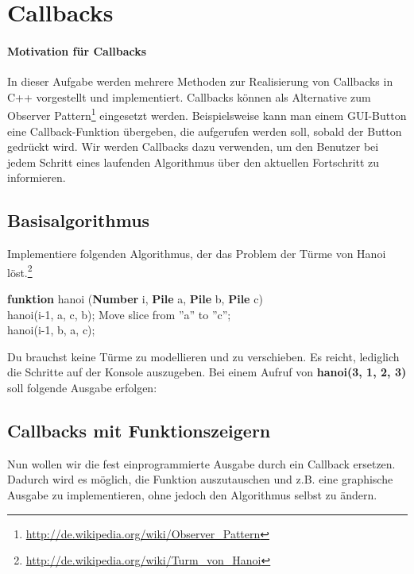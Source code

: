 \section{\ExercisePrefixAdvanced Callbacks}
\label{sec:callbacks}

\paragraph*{Motivation für Callbacks}
In dieser Aufgabe werden mehrere Methoden zur Realisierung von Callbacks in C++ vorgestellt und implementiert.
Callbacks können als Alternative zum Observer Pattern\footnote{\url{http://de.wikipedia.org/wiki/Observer_Pattern}} eingesetzt werden.
Beispielsweise kann man einem GUI-Button eine Callback-Funktion übergeben, die aufgerufen werden soll, sobald der Button gedrückt wird.
Wir werden Callbacks dazu verwenden, um den Benutzer bei jedem Schritt eines laufenden Algorithmus über den aktuellen Fortschritt zu informieren.

\subsection{Basisalgorithmus}
Implementiere folgenden Algorithmus, der das Problem der Türme von Hanoi löst.\footnote{\url{http://de.wikipedia.org/wiki/Turm_von_Hanoi}}\\
\begin{algorithm}[H]
 \SetAlgoLined
 \textbf{funktion} hanoi (\textbf{Number} i, \textbf{Pile} a, \textbf{Pile} b, \textbf{Pile} c) { \\
      {
        hanoi(i-1, a, c, b); 
        Move slice from ''a'' to ''c''; \\
        hanoi(i-1, b, a, c); 
     }
 }
\end{algorithm}

Du brauchst keine Türme zu modellieren und zu verschieben.
Es reicht, lediglich die Schritte auf der Konsole auszugeben. 
Bei einem Aufruf von \textbf{hanoi(3, 1, 2, 3)} soll folgende Ausgabe erfolgen:


\subsection{Callbacks mit Funktionszeigern}
Nun wollen wir die fest einprogrammierte Ausgabe durch ein Callback ersetzen. Dadurch wird es möglich, die Funktion auszutauschen und z.B. eine graphische Ausgabe zu implementieren, ohne jedoch den Algorithmus selbst zu ändern.

